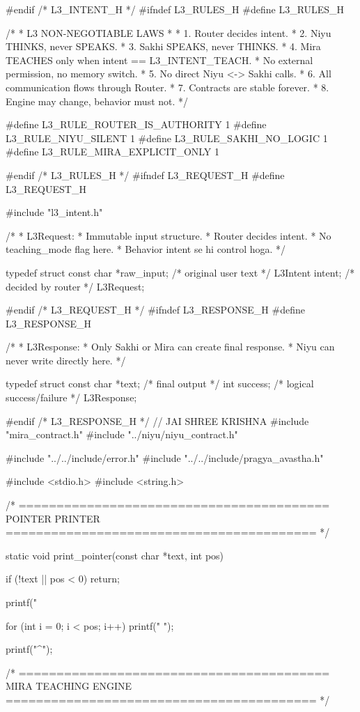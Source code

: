 \documentclass{article}
\begin{document}
#endif /* L3_INTENT_H */
#ifndef L3_RULES_H
#define L3_RULES_H

/*
 * L3 NON-NEGOTIABLE LAWS
 *
 * 1. Router decides intent.
 * 2. Niyu THINKS, never SPEAKS.
 * 3. Sakhi SPEAKS, never THINKS.
 * 4. Mira TEACHES only when intent == L3_INTENT_TEACH.
 *    No external permission, no memory switch.
 * 5. No direct Niyu <-> Sakhi calls.
 * 6. All communication flows through Router.
 * 7. Contracts are stable forever.
 * 8. Engine may change, behavior must not.
 */

#define L3_RULE_ROUTER_IS_AUTHORITY 1
#define L3_RULE_NIYU_SILENT         1
#define L3_RULE_SAKHI_NO_LOGIC      1
#define L3_RULE_MIRA_EXPLICIT_ONLY  1

#endif /* L3_RULES_H */
#ifndef L3_REQUEST_H
#define L3_REQUEST_H

#include "l3_intent.h"

/*
 * L3Request:
 * Immutable input structure.
 * Router decides intent.
 * No teaching_mode flag here.
 * Behavior intent se hi control hoga.
 */

typedef struct {
    const char *raw_input;     /* original user text */
    L3Intent    intent;        /* decided by router */
} L3Request;

#endif /* L3_REQUEST_H */
#ifndef L3_RESPONSE_H
#define L3_RESPONSE_H

/*
 * L3Response:
 * Only Sakhi or Mira can create final response.
 * Niyu can never write directly here.
 */

typedef struct {
    const char *text;      /* final output */
    int         success;   /* logical success/failure */
} L3Response;

#endif /* L3_RESPONSE_H */
// JAI SHREE KRISHNA
#include "mira_contract.h"
#include "../niyu/niyu_contract.h"

#include "../../include/error.h"
#include "../../include/pragya_avastha.h"

#include <stdio.h>
#include <string.h>


/* =========================================
   POINTER PRINTER
========================================= */

static void print_pointer(const char *text, int pos)
{
    if (!text || pos < 0)
        return;

    printf("%

    for (int i = 0; i < pos; i++)
        printf(" ");

    printf("^\n\n");
}


/* =========================================
   MIRA TEACHING ENGINE
========================================= */
\end{document}
